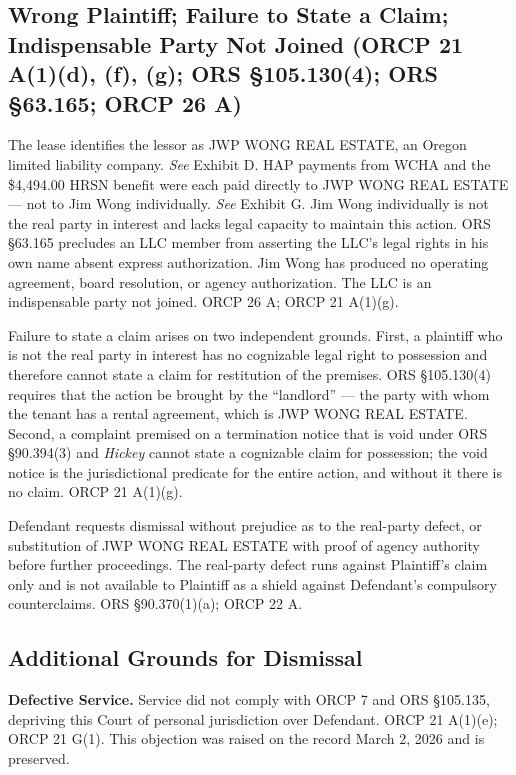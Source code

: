 \documentclass[12pt,letterpaper]{article}
\begin{document}
	\subsection{Wrong Plaintiff; Failure to State a Claim; Indispensable Party Not Joined (ORCP 21 A(1)(d), (f), (g); ORS \S105.130(4); ORS \S63.165; ORCP 26 A)}
	
	The lease identifies the lessor as JWP WONG REAL ESTATE, an Oregon limited liability company. \textit{See} Exhibit D. HAP payments from WCHA and the \$4,494.00 HRSN benefit were each paid directly to JWP WONG REAL ESTATE --- not to Jim Wong individually. \textit{See} Exhibit G. Jim Wong individually is not the real party in interest and lacks legal capacity to maintain this action. ORS \S63.165 precludes an LLC member from asserting the LLC's legal rights in his own name absent express authorization. Jim Wong has produced no operating agreement, board resolution, or agency authorization. The LLC is an indispensable party not joined. ORCP 26 A; ORCP 21 A(1)(g).
	
	Failure to state a claim arises on two independent grounds. First, a plaintiff who is not the real party in interest has no cognizable legal right to possession and therefore cannot state a claim for restitution of the premises. ORS \S105.130(4) requires that the action be brought by the ``landlord'' --- the party with whom the tenant has a rental agreement, which is JWP WONG REAL ESTATE. Second, a complaint premised on a termination notice that is void under ORS \S90.394(3) and \textit{Hickey} cannot state a cognizable claim for possession; the void notice is the jurisdictional predicate for the entire action, and without it there is no claim. ORCP 21 A(1)(g).
	
	Defendant requests dismissal without prejudice as to the real-party defect, or substitution of JWP WONG REAL ESTATE with proof of agency authority before further proceedings. The real-party defect runs against Plaintiff's claim only and is not available to Plaintiff as a shield against Defendant's compulsory counterclaims. ORS \S90.370(1)(a); ORCP 22 A.
	
	\subsection{Additional Grounds for Dismissal}
	
	\textbf{Defective Service.} Service did not comply with ORCP 7 and ORS \S105.135, depriving this Court of personal jurisdiction over Defendant. ORCP 21 A(1)(e); ORCP 21 G(1). This objection was raised on the record March 2, 2026 and is preserved.
	
\end{document}
